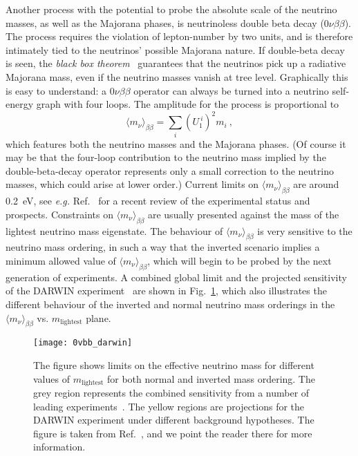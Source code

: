 Another process with the potential to probe the absolute scale of the neutrino
masses, as well as the Majorana phases, is neutrinoless double beta decay
($0\nu\beta\beta$). The process requires the violation of lepton-number by two
units, and is therefore intimately tied to the neutrinos' possible Majorana
nature. If double-beta decay is seen, the \textit{black box
  theorem}~\cite{Schechter:1981bd, Takasugi:1984xr, Hirsch:2006yk} guarantees
that the neutrinos pick up a radiative Majorana mass, even if the neutrino
masses vanish at tree level. Graphically this is easy to understand: a
$0\nu\beta\beta$ operator can always be turned into a neutrino self-energy graph
with four loops. The amplitude for the process is proportional to
\begin{equation}
  \langle m_{\nu} \rangle_{\beta\beta} = \sum_{i} (U_{1}^{\ i})^{2} m_{i} \ ,
\end{equation}
which features both the neutrino masses and the Majorana phases. (Of course it
may be that the four-loop contribution to the neutrino mass implied by the
double-beta-decay operator represents only a small correction to the neutrino
masses, which could arise at lower order.) Current limits on
$\langle m_{\nu} \rangle_{\beta\beta}$ are around \SI{0.2}{\eV}, see
\textit{e.g.} Ref.~\cite{Dolinski:2019nrj} for a recent review of the
experimental status and prospects. Constraints on
$\langle m_{\nu} \rangle_{\beta\beta}$ are usually presented against the mass of
the lightest neutrino mass eigenstate. The behaviour of
$\langle m_{\nu} \rangle_{\beta\beta}$ is very sensitive to the neutrino mass
ordering, in such a way that the inverted scenario implies a minimum allowed
value of $\langle m_{\nu} \rangle_{\beta\beta}$, which will begin to be probed
by the next generation of experiments. A combined global limit and the projected
sensitivity of the DARWIN experiment~\cite{Agostini:2020adk} are shown in
Fig.~\ref{fig:0vbb-darwin}, which also illustrates the different behaviour of
the inverted and normal neutrino mass orderings in the
$\langle m_{\nu} \rangle_{\beta\beta}$ vs. $m_{\text{lightest}}$ plane.

\begin{figure}[t]
  \centering
  \texttt{[image: 0vbb\_darwin]}
  \caption{The figure shows limits on the effective neutrino mass for different
    values of $m_{\text{lightest}}$ for both normal and inverted mass ordering.
    The grey region represents the combined sensitivity from a number of leading
    experiments~\cite{Agostini:2019hzm}. The yellow regions are projections for
    the DARWIN experiment under different background hypotheses. The figure is
    taken from Ref.~\cite{Agostini:2020adk}, and we point the reader there for
    more information.}
  \label{fig:0vbb-darwin}
\end{figure}

